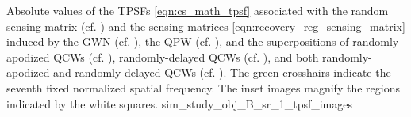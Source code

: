 %
{%
 Absolute values of
 the \aclp{TPSF}
 \eqref{eqn:cs_math_tpsf} associated with
 the random sensing matrix
 (cf. ) and
 the sensing matrices
 \eqref{eqn:recovery_reg_sensing_matrix} induced by
 the \acl{GWN}
 (cf. ),
 the \acl{QPW}
 (cf. ), and
 the superpositions of
 randomly-apodized \acfp{QCW}
 (cf. ),
 randomly-delayed \acp{QCW}
 (cf. ), and both
 randomly-apodized and
 randomly-delayed \acp{QCW}
 (cf. ).
 The green crosshairs indicate
 the seventh fixed normalized spatial frequency.
 The inset images magnify
 the regions indicated by
 the white squares.
}%
{sim_study_obj_B_sr_1_tpsf_images}

